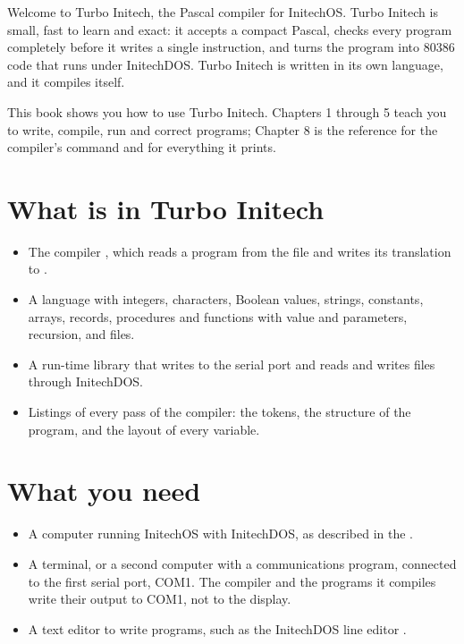 \IntroductionChapter

Welcome to Turbo Initech\reg{}, the Pascal compiler for InitechOS.  Turbo
Initech is small, fast to learn and exact: it accepts a compact Pascal,
checks every program completely before it writes a single instruction,
and turns the program into 80386 code that runs under InitechDOS\tm{}.
Turbo Initech is written in its own language, and it compiles itself.

This book shows you how to use Turbo Initech.  Chapters 1 through 5 teach
you to write, compile, run and correct programs; Chapter 8 is the
reference for the compiler's command and for everything it prints.

\section{What is in Turbo Initech}
\begin{itemize}
\item The compiler , which reads a program from the file
   and writes its translation to .
\item A language with integers, characters, Boolean values, strings,
  constants, arrays, records, procedures and functions with value and
   parameters, recursion, and files.
\item A run-time library that writes to the serial port and reads and
  writes files through InitechDOS.
\item Listings of every pass of the compiler: the tokens, the structure
  of the program, and the layout of every variable.
\end{itemize}

\section{What you need}
\begin{itemize}
\item A computer running InitechOS with InitechDOS, as described in the
  .
\item A terminal, or a second computer with a communications program,
  connected to the first serial port, COM1.  The compiler and the programs
  it compiles write their output to COM1, not to the display.
\item A text editor to write programs, such as the InitechDOS line editor
  .
\end{itemize}

